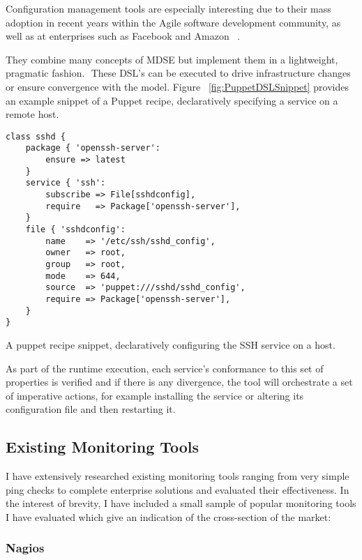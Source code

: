 \documentclass{cshonours}
\begin{document}
Configuration management tools are especially interesting due to their mass adoption in recent years within the Agile software development community, as well as at enterprises such as Facebook and Amazon ~\cite{Chef}.

They combine many concepts of MDSE but implement them in a lightweight, pragmatic fashion.  These DSL’s can be executed to drive infrastructure changes or ensure convergence with the model. Figure ~\ref{fig:PuppetDSLSnippet} provides an example snippet of a Puppet recipe, declaratively specifying a service on a remote host. 

\begin{listing}[h]
\begin{verbatim}
class sshd { 
    package { 'openssh-server': 
        ensure => latest 
    } 
    service { 'ssh': 
        subscribe => File[sshdconfig], 
        require   => Package['openssh-server'], 
    } 
    file { 'sshdconfig': 
        name    => '/etc/ssh/sshd_config', 
        owner   => root, 
        group   => root, 
        mode    => 644, 
        source  => 'puppet:///sshd/sshd_config', 
        require => Package['openssh-server'], 
    } 
}
\end{verbatim}
\caption{A puppet recipe snippet, declaratively configuring the SSH service on a host.}
\label{fig:PuppetDSLSnippet}
\end{listing}

As part of the runtime execution, each service’s conformance to this set of properties is verified and if there is any divergence, the tool will orchestrate a set of imperative actions, for example installing the service or altering its configuration file and then restarting it.

\pagebreak
\subsection{Existing Monitoring Tools}

I have extensively researched existing monitoring tools ranging from very simple ping checks to complete enterprise solutions and evaluated their effectiveness. In the interest of brevity, I have included a small sample of popular monitoring tools I have evaluated which give an indication of the cross-section of the market:

\subsubsection{Nagios}
\end{document}
